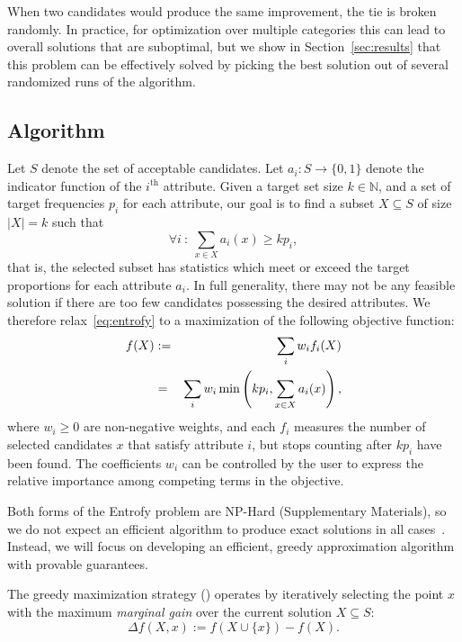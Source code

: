 \documentclass[10pt,letterpaper]{article}
\begin{document}
When two candidates would produce the same improvement, the tie is broken randomly.
In practice, for optimization over multiple categories this can lead to overall solutions that are suboptimal, but we show in Section~\ref{sec:results} that this problem can be effectively solved by picking the best solution out of several randomized runs of the algorithm. 

\subsection*{Algorithm}

Let $S$ denote the set of acceptable candidates.
Let ${a_i : S \rightarrow \{0, 1\}}$ denote the indicator function of the $i^\text{th}$ attribute.
Given a target set size $k \in \mathbb{N}$, and a set of target frequencies $p_i$ for each attribute, our
goal is to find a subset $X \subseteq S$ of size $|X|=k$ such that
\begin{equation}
    \forall i~:~\sum_{x \in X} a_i(x) \geq k p_i,\label{eq:entrofy}
\end{equation}
that is, the selected subset has statistics which meet or exceed the target proportions for each attribute $a_i$.
In full generality, there may not be any feasible solution if there are too few candidates possessing the desired attributes.
We therefore relax~\eqref{eq:entrofy} to a maximization of the following objective function:
\begin{eqnarray}
    f(X) &:=& \sum_i w_i f_i(X) \label{eq:entrofy-opt}\\
         &=& \sum_i w_i \min\left(k p_i, \sum_{x \in X} a_i(x)\right),\notag
\end{eqnarray}
where $w_i \geq 0$ are non-negative weights, and each $f_i$ measures the number of selected candidates $x$ that satisfy attribute $i$, but stops counting after $kp_i$ have been found.
The coefficients $w_i$ can be controlled by the user to express the relative importance among competing terms in the objective.

Both forms of the Entrofy problem are NP-Hard (Supplementary Materials), so we do not expect an efficient algorithm to produce exact solutions in all cases~\cite{gary1979computers}.
Instead, we will focus on developing an efficient, greedy approximation algorithm with provable guarantees.

The greedy maximization strategy () operates by iteratively selecting the point $x$ with the maximum \emph{marginal gain} over the current solution $X\subseteq S$:
\begin{equation}
    \Delta f(X, x) := f\left(X \cup \{x\}\right) - f(X).
\end{equation}
\end{document}
